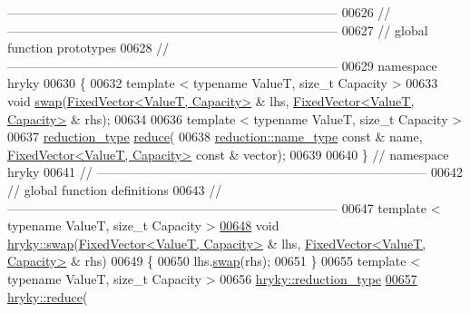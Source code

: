 \begin{DoxyCode}
{      ------------------------------------------------------------------------------}
00626 \textcolor{comment}{//
      ------------------------------------------------------------------------------}
00627 \textcolor{comment}{// global function prototypes}
00628 \textcolor{comment}{//
      ------------------------------------------------------------------------------}
00629 \textcolor{keyword}{namespace }hryky
00630 \{
00632     \textcolor{keyword}{template} < \textcolor{keyword}{typename} ValueT, \textcolor{keywordtype}{size\_t} Capacity >
00633     \textcolor{keywordtype}{void} \hyperlink{namespacehryky_a4282146df5ea2b68cb667896a2205909}{swap}(\hyperlink{classhryky_1_1_fixed_vector}{FixedVector<ValueT, Capacity>} & lhs, \hyperlink{classhryky_1_1_fixed_vector}{FixedVector<ValueT, Capacity>}
       & rhs);
00634 
00636     \textcolor{keyword}{template} < \textcolor{keyword}{typename} ValueT, \textcolor{keywordtype}{size\_t} Capacity >
00637     \hyperlink{classhryky_1_1_intrusive_ptr}{reduction_type} \hyperlink{namespacehryky_af41cb3af6766761da0ff21b84527a52c}{reduce}(
00638         \hyperlink{classhryky_1_1reduction_1_1_string}{reduction::name_type} \textcolor{keyword}{const} & name, \hyperlink{classhryky_1_1_fixed_vector}{FixedVector<ValueT, Capacity>} \textcolor{keyword}{const} 
      & vector);
00639 
00640 \} \textcolor{comment}{// namespace hryky}
00641 \textcolor{comment}{//
      ------------------------------------------------------------------------------}
00642 \textcolor{comment}{// global function definitions}
00643 \textcolor{comment}{//
      ------------------------------------------------------------------------------}
00647 \textcolor{comment}{}\textcolor{keyword}{template} < \textcolor{keyword}{typename} ValueT, \textcolor{keywordtype}{size\_t} Capacity >
\hypertarget{fixed__vector_8h_source_l00648}{}\hyperlink{namespacehryky_a0feb3a8be23701a830a3f21c9230dae8}{00648} \textcolor{keywordtype}{void} \hyperlink{namespacehryky_a4282146df5ea2b68cb667896a2205909}{hryky::swap}(\hyperlink{classhryky_1_1_fixed_vector}{FixedVector<ValueT, Capacity>} & lhs, 
      \hyperlink{classhryky_1_1_fixed_vector}{FixedVector<ValueT, Capacity>} & rhs)
00649 \{
00650     lhs.\hyperlink{classhryky_1_1_fixed_vector_a6b0a09a540438463dd2017419a6a600e}{swap}(rhs);
00651 \}
00655 \textcolor{keyword}{template} < \textcolor{keyword}{typename} ValueT, \textcolor{keywordtype}{size\_t} Capacity >
00656 \hyperlink{classhryky_1_1_intrusive_ptr}{hryky::reduction_type}
\hypertarget{fixed__vector_8h_source_l00657}{}\hyperlink{namespacehryky_a8b6504070e437bb6817fefe0b6d6618c}{00657} \hyperlink{namespacehryky_af41cb3af6766761da0ff21b84527a52c}{hryky::reduce}(

\end{DoxyCode}
